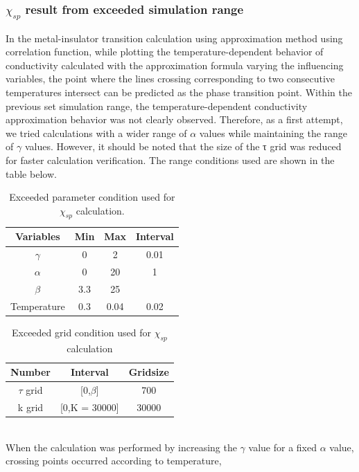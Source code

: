\documentclass{article}[12pt]
\begin{document}
\begin{spacing}{1.5}
\subsubsection*{$\chi_{sp}$ result from exceeded simulation range}
In the metal-insulator transition calculation using approximation method using correlation function, 
while plotting the temperature-dependent behavior of conductivity calculated with the approximation formula varying the influencing variables, 
the point where the lines crossing corresponding to two consecutive temperatures intersect can be predicted as the phase transition point.
Within the previous set simulation range, 
the temperature-dependent conductivity approximation behavior was not clearly observed. 
Therefore, as a first attempt, we tried calculations with a wider range of $\alpha$ values while maintaining the range of $\gamma$ values. 
However, it should be noted that the size of the τ grid was reduced for faster calculation verification. 
The range conditions used are shown in the table below.
\begin{table}[htbp]
  \centering
  \renewcommand{\arraystretch}{1.2}  %
  \begin{tabular}{@{}cccc@{}}
  \toprule
  \textbf{Variables} & \textbf{Min} & \textbf{Max}  & \textbf{Interval}\\ 
  \midrule
  $\gamma$ & 0 & 2 & 0.01 \\
  $\alpha$ & 0 & 20 & 1 \\
  $\beta$ & 3.3 & 25 &  \\
  Temperature & 0.3 & 0.04 & 0.02 \\
  \bottomrule
  \end{tabular}
  \caption{Exceeded parameter condition used for $\chi_{sp}$ calculation.}
  \end{table}
\begin{table}[htbp]
  \centering
  \renewcommand{\arraystretch}{1.2}  %
  \begin{tabular}{@{}ccc@{}}
  \toprule
  \textbf{Number} & \textbf{Interval} & \textbf{Gridsize}\\ 
  \midrule
  $\tau$ grid & [0,$\beta$] & 700 \\
  k grid & [0,K = 30000] & 30000 \\
  \bottomrule
  \end{tabular}
  \caption{Exceeded grid condition used for $\chi_{sp}$ calculation}
  \end{table}
\\
When the calculation was performed by increasing the $\gamma$ value for a fixed $\alpha$ value, crossing points occurred according to temperature, 

\end{spacing}
\end{document}
